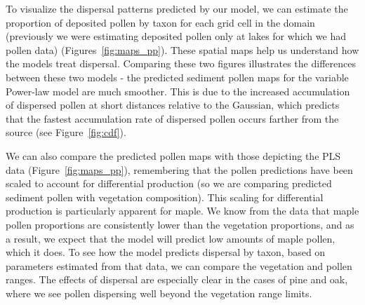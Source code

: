 \documentclass[12pt]{article}
\begin{document}



To visualize the dispersal patterns predicted by our model, we can
estimate the proportion of deposited pollen by taxon for each grid
cell in the domain (previously we were estimating deposited pollen
only at lakes for which we had pollen data)
(Figures~\ref{fig:maps_pp}). These spatial maps help us understand how
the models treat dispersal. Comparing these two figures illustrates
the differences between these two models - the predicted sediment
pollen maps for the variable Power-law model are much smoother. This
is due to the increased accumulation of dispersed pollen at short
distances relative to the Gaussian, which predicts that the fastest
accumulation rate of dispersed pollen occurs farther from the source
(see Figure~\ref{fig:cdf}).

We can also compare the predicted pollen maps with those depicting the
PLS data (Figure~\ref{fig:maps_pp}), remembering that the pollen
predictions have been scaled to account for differential production
(so we are comparing predicted sediment pollen with vegetation
composition). This scaling for differential production is particularly
apparent for maple. We know from the data that maple pollen
proportions are consistently lower than the vegetation proportions,
and as a result, we expect that the model will predict low amounts of
maple pollen, which it does. To see how the model predicts dispersal
by taxon, based on parameters estimated from that data, we can compare
the vegetation and pollen ranges. The effects of dispersal are
especially clear in the cases of pine and oak, where we see pollen
dispersing well beyond the vegetation range limits.
\end{document}

